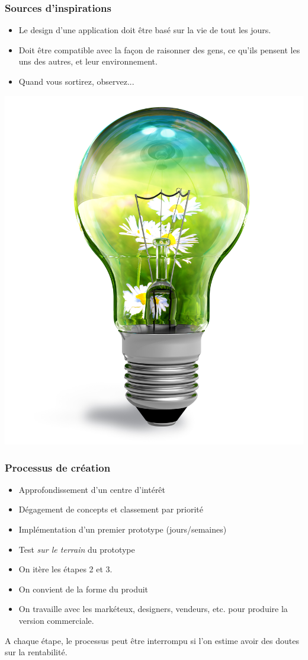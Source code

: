 \documentclass{beamer}
\begin{document}
\begin{frame}
\frametitle{Sources d'inspirations}
\begin{itemize}
	\item Le design d'une application doit être basé sur la vie de tout les jours.
	\item Doit être compatible avec la façon de raisonner des gens, ce qu'ils pensent les uns des autres, et leur environnement.
	\item Quand vous sortirez, observez...
\end{itemize}
\begin{center}
\includegraphics[scale=0.1]{idea.jpg}
\end{center}
\end{frame}

\begin{frame}
\frametitle{Processus de création}
\begin{itemize}
	\item Approfondissement d'un centre d'intérêt
	\item Dégagement de concepts et classement par priorité
	\item Implémentation d'un premier prototype (jours/semaines)
	\item Test \emph{sur le terrain} du prototype
	\item On itère les étapes 2 et 3.
	\item On convient de la forme du produit
	\item On travaille avec les markéteux, designers, vendeurs, etc. pour produire la version commerciale.
\end{itemize}
A chaque étape, le processus peut être interrompu si l'on estime avoir des doutes sur la rentabilité.
\end{frame}
\end{document}
